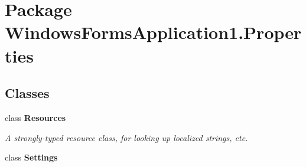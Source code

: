 \hypertarget{namespace_windows_forms_application1_1_1_properties}{}\section{Package Windows\+Forms\+Application1.\+Properties}
\label{namespace_windows_forms_application1_1_1_properties}
\subsection*{Classes}
\begin{DoxyCompactItemize}
\item 
class {\bfseries Resources}
\begin{DoxyCompactList}\small\item\em A strongly-\/typed resource class, for looking up localized strings, etc. \end{DoxyCompactList}\item 
class {\bfseries Settings}
\end{DoxyCompactItemize}
